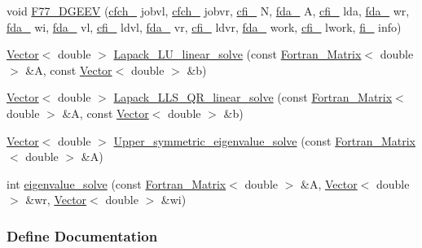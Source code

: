\begin{DoxyCompactItemize}
\item 
void \hyperlink{lapack_8h_a46f1ea821def22af4ed50f7f58c1c4e0}{F77\_\-DGEEV} (\hyperlink{fortran_8h_a58a9b627931857027cf0be46162b2d5f}{cfch\_\-} jobvl, \hyperlink{fortran_8h_a58a9b627931857027cf0be46162b2d5f}{cfch\_\-} jobvr, \hyperlink{fortran_8h_ab3df84a792bbb23408a136cf4825aeb4}{cfi\_\-} N, \hyperlink{fortran_8h_a4a18500881ce6d14fcd7eb76b43d6d93}{fda\_\-} A, \hyperlink{fortran_8h_ab3df84a792bbb23408a136cf4825aeb4}{cfi\_\-} lda, \hyperlink{fortran_8h_a4a18500881ce6d14fcd7eb76b43d6d93}{fda\_\-} wr, \hyperlink{fortran_8h_a4a18500881ce6d14fcd7eb76b43d6d93}{fda\_\-} wi, \hyperlink{fortran_8h_a4a18500881ce6d14fcd7eb76b43d6d93}{fda\_\-} vl, \hyperlink{fortran_8h_ab3df84a792bbb23408a136cf4825aeb4}{cfi\_\-} ldvl, \hyperlink{fortran_8h_a4a18500881ce6d14fcd7eb76b43d6d93}{fda\_\-} vr, \hyperlink{fortran_8h_ab3df84a792bbb23408a136cf4825aeb4}{cfi\_\-} ldvr, \hyperlink{fortran_8h_a4a18500881ce6d14fcd7eb76b43d6d93}{fda\_\-} work, \hyperlink{fortran_8h_ab3df84a792bbb23408a136cf4825aeb4}{cfi\_\-} lwork, \hyperlink{fortran_8h_a5fb0f459886dcbd01f485acca3066001}{fi\_\-} info)
\item 
\hyperlink{class_t_n_t_1_1_vector}{Vector}$<$ double $>$ \hyperlink{lapack_8h_a3b061771d71cdbc7fecab5fd43629e5e}{Lapack\_\-LU\_\-linear\_\-solve} (const \hyperlink{class_t_n_t_1_1_fortran___matrix}{Fortran\_\-Matrix}$<$ double $>$ \&A, const \hyperlink{class_t_n_t_1_1_vector}{Vector}$<$ double $>$ \&b)
\item 
\hyperlink{class_t_n_t_1_1_vector}{Vector}$<$ double $>$ \hyperlink{lapack_8h_aee400c2434cd9ac8536a209a7e61d219}{Lapack\_\-LLS\_\-QR\_\-linear\_\-solve} (const \hyperlink{class_t_n_t_1_1_fortran___matrix}{Fortran\_\-Matrix}$<$ double $>$ \&A, const \hyperlink{class_t_n_t_1_1_vector}{Vector}$<$ double $>$ \&b)
\item 
\hyperlink{class_t_n_t_1_1_vector}{Vector}$<$ double $>$ \hyperlink{lapack_8h_a22d5ca2db81709756ee24e1f7edc2598}{Upper\_\-symmetric\_\-eigenvalue\_\-solve} (const \hyperlink{class_t_n_t_1_1_fortran___matrix}{Fortran\_\-Matrix}$<$ double $>$ \&A)
\item 
int \hyperlink{lapack_8h_acd0564b1329b11a46046b7f92ecdae36}{eigenvalue\_\-solve} (const \hyperlink{class_t_n_t_1_1_fortran___matrix}{Fortran\_\-Matrix}$<$ double $>$ \&A, \hyperlink{class_t_n_t_1_1_vector}{Vector}$<$ double $>$ \&wr, \hyperlink{class_t_n_t_1_1_vector}{Vector}$<$ double $>$ \&wi)
\end{DoxyCompactItemize}


\subsubsection{Define Documentation}
